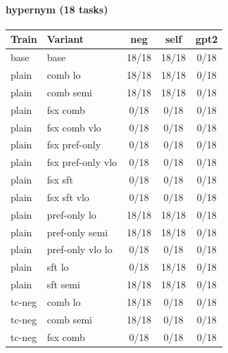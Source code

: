 \documentclass[10pt,landscape]{article}
\begin{document}
\paragraph{hypernym (18 tasks)}
\begin{tabular}{llccc}
\toprule
Train & Variant & neg & self & gpt2 \\
\midrule
base & base & \cellcolor{done}18/18 & \cellcolor{done}18/18 & \cellcolor{missing}0/18 \\
plain & comb lo & \cellcolor{done}18/18 & \cellcolor{done}18/18 & \cellcolor{missing}0/18 \\
plain & comb semi & \cellcolor{done}18/18 & \cellcolor{done}18/18 & \cellcolor{missing}0/18 \\
plain & fsx comb & \cellcolor{missing}0/18 & \cellcolor{missing}0/18 & \cellcolor{missing}0/18 \\
plain & fsx comb vlo & \cellcolor{missing}0/18 & \cellcolor{missing}0/18 & \cellcolor{missing}0/18 \\
plain & fsx pref-only & \cellcolor{missing}0/18 & \cellcolor{missing}0/18 & \cellcolor{missing}0/18 \\
plain & fsx pref-only vlo & \cellcolor{missing}0/18 & \cellcolor{missing}0/18 & \cellcolor{missing}0/18 \\
plain & fsx sft & \cellcolor{missing}0/18 & \cellcolor{missing}0/18 & \cellcolor{missing}0/18 \\
plain & fsx sft vlo & \cellcolor{missing}0/18 & \cellcolor{missing}0/18 & \cellcolor{missing}0/18 \\
plain & pref-only lo & \cellcolor{done}18/18 & \cellcolor{done}18/18 & \cellcolor{missing}0/18 \\
plain & pref-only semi & \cellcolor{done}18/18 & \cellcolor{done}18/18 & \cellcolor{missing}0/18 \\
plain & pref-only vlo lo & \cellcolor{missing}0/18 & \cellcolor{missing}0/18 & \cellcolor{missing}0/18 \\
plain & sft lo & \cellcolor{missing}0/18 & \cellcolor{done}18/18 & \cellcolor{missing}0/18 \\
plain & sft semi & \cellcolor{done}18/18 & \cellcolor{done}18/18 & \cellcolor{missing}0/18 \\
tc-neg & comb lo & \cellcolor{done}18/18 & \cellcolor{missing}0/18 & \cellcolor{missing}0/18 \\
tc-neg & comb semi & \cellcolor{done}18/18 & \cellcolor{missing}0/18 & \cellcolor{missing}0/18 \\
tc-neg & fsx comb & \cellcolor{missing}0/18 & \cellcolor{missing}0/18 & \cellcolor{missing}0/18 \\

\end{tabular}
\end{document}
